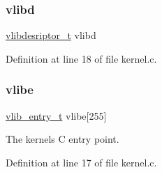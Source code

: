 \subsubsection{\texorpdfstring{vlibd}{vlibd}}
{\footnotesize\ttfamily \hyperlink{a00158_a2d9000b4fbb25c5ed2950a2d8f4921d5_a2d9000b4fbb25c5ed2950a2d8f4921d5}{vlibdesriptor\+\_\+t} vlibd}



Definition at line 18 of file kernel.\+c.

\mbox{\label{a00047_af69f4f709fdab28dec6b8fb75fb4d526_af69f4f709fdab28dec6b8fb75fb4d526}} 
\subsubsection{\texorpdfstring{vlibe}{vlibe}}
{\footnotesize\ttfamily \hyperlink{a00158_a97c1a7136f2ab06368e93c2d7533d619_a97c1a7136f2ab06368e93c2d7533d619}{vlib\+\_\+entry\+\_\+t} vlibe\mbox{[}255\mbox{]}}



The kernels C entry point. 



Definition at line 17 of file kernel.\+c.

